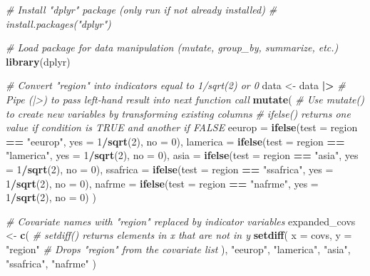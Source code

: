 \documentclass[
  12pt,
  leqno]{article}
\newenvironment{Shaded}{\begin{snugshade}}{\end{snugshade}}
\newcommand{\AttributeTok}[1]{\textcolor[rgb]{0.13,0.29,0.53}{#1}}
\newcommand{\CommentTok}[1]{\textcolor[rgb]{0.56,0.35,0.01}{\textit{#1}}}
\newcommand{\DecValTok}[1]{\textcolor[rgb]{0.00,0.00,0.81}{#1}}
\newcommand{\FunctionTok}[1]{\textcolor[rgb]{0.13,0.29,0.53}{\textbf{#1}}}
\newcommand{\NormalTok}[1]{#1}
\newcommand{\OtherTok}[1]{\textcolor[rgb]{0.56,0.35,0.01}{#1}}
\newcommand{\SpecialCharTok}[1]{\textcolor[rgb]{0.81,0.36,0.00}{\textbf{#1}}}
\newcommand{\StringTok}[1]{\textcolor[rgb]{0.31,0.60,0.02}{#1}}
\begin{document}
\begin{Shaded}
\begin{Highlighting}[]
\CommentTok{\# Install "dplyr" package (only run if not already installed)}
\CommentTok{\# install.packages("dplyr")}

\CommentTok{\# Load package for data manipulation (mutate, group\_by, summarize, etc.)}
\FunctionTok{library}\NormalTok{(dplyr)}

\CommentTok{\# Convert "region" into indicators equal to 1/sqrt(2) or 0}
\NormalTok{data }\OtherTok{\textless{}{-}}\NormalTok{ data }\SpecialCharTok{|\textgreater{}} \CommentTok{\# Pipe (|\textgreater{}) to pass left{-}hand result into next function call}
  \FunctionTok{mutate}\NormalTok{(}
    \CommentTok{\# Use mutate() to create new variables by transforming existing columns}
    \CommentTok{\# ifelse() returns one value if condition is TRUE and another if FALSE}
    \AttributeTok{eeurop   =} \FunctionTok{ifelse}\NormalTok{(}\AttributeTok{test =}\NormalTok{ region }\SpecialCharTok{==} \StringTok{"eeurop"}\NormalTok{,   }\AttributeTok{yes =} \DecValTok{1}\SpecialCharTok{/}\FunctionTok{sqrt}\NormalTok{(}\DecValTok{2}\NormalTok{), }\AttributeTok{no =} \DecValTok{0}\NormalTok{),}
    \AttributeTok{lamerica =} \FunctionTok{ifelse}\NormalTok{(}\AttributeTok{test =}\NormalTok{ region }\SpecialCharTok{==} \StringTok{"lamerica"}\NormalTok{, }\AttributeTok{yes =} \DecValTok{1}\SpecialCharTok{/}\FunctionTok{sqrt}\NormalTok{(}\DecValTok{2}\NormalTok{), }\AttributeTok{no =} \DecValTok{0}\NormalTok{),}
    \AttributeTok{asia     =} \FunctionTok{ifelse}\NormalTok{(}\AttributeTok{test =}\NormalTok{ region }\SpecialCharTok{==} \StringTok{"asia"}\NormalTok{,     }\AttributeTok{yes =} \DecValTok{1}\SpecialCharTok{/}\FunctionTok{sqrt}\NormalTok{(}\DecValTok{2}\NormalTok{), }\AttributeTok{no =} \DecValTok{0}\NormalTok{),}
    \AttributeTok{ssafrica =} \FunctionTok{ifelse}\NormalTok{(}\AttributeTok{test =}\NormalTok{ region }\SpecialCharTok{==} \StringTok{"ssafrica"}\NormalTok{, }\AttributeTok{yes =} \DecValTok{1}\SpecialCharTok{/}\FunctionTok{sqrt}\NormalTok{(}\DecValTok{2}\NormalTok{), }\AttributeTok{no =} \DecValTok{0}\NormalTok{),}
    \AttributeTok{nafrme   =} \FunctionTok{ifelse}\NormalTok{(}\AttributeTok{test =}\NormalTok{ region }\SpecialCharTok{==} \StringTok{"nafrme"}\NormalTok{,   }\AttributeTok{yes =} \DecValTok{1}\SpecialCharTok{/}\FunctionTok{sqrt}\NormalTok{(}\DecValTok{2}\NormalTok{), }\AttributeTok{no =} \DecValTok{0}\NormalTok{)}
\NormalTok{  )}

\CommentTok{\# Covariate names with "region" replaced by indicator variables}
\NormalTok{expanded\_covs }\OtherTok{\textless{}{-}} \FunctionTok{c}\NormalTok{(}
  \CommentTok{\# setdiff() returns elements in \textquotesingle{}x\textquotesingle{} that are not in \textquotesingle{}y\textquotesingle{}}
  \FunctionTok{setdiff}\NormalTok{(}
    \AttributeTok{x =}\NormalTok{ covs,}
    \AttributeTok{y =} \StringTok{"region"} \CommentTok{\# Drops "region" from the covariate list}
\NormalTok{  ),}
  \StringTok{"eeurop"}\NormalTok{, }\StringTok{"lamerica"}\NormalTok{, }\StringTok{"asia"}\NormalTok{, }\StringTok{"ssafrica"}\NormalTok{, }\StringTok{"nafrme"}
\NormalTok{)}
\end{Highlighting}
\end{Shaded}
\end{document}
